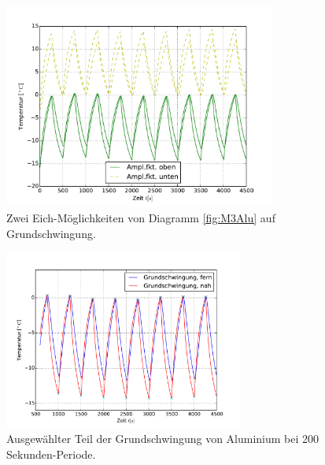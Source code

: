 \begin{figure}[h!]
	\centering
	\includegraphics[width=0.8\textwidth]{Bilder/Normierungsauswahl/M3_Alu_norm.pdf}
	\caption{Zwei Eich-Möglichkeiten von Diagramm \ref{fig:M3Alu} auf Grundschwingung.}
	\label{fig:M3AluNorm}
\end{figure}
\begin{figure}[h!]
	\centering
	\includegraphics[width=0.7\textwidth]{Bilder/M3_Alu_norm.pdf}
	\caption{Ausgewählter Teil der Grundschwingung von Aluminium bei 200 Sekunden-Periode.}
	\label{fig:M3AluNormkurve}
\end{figure}
